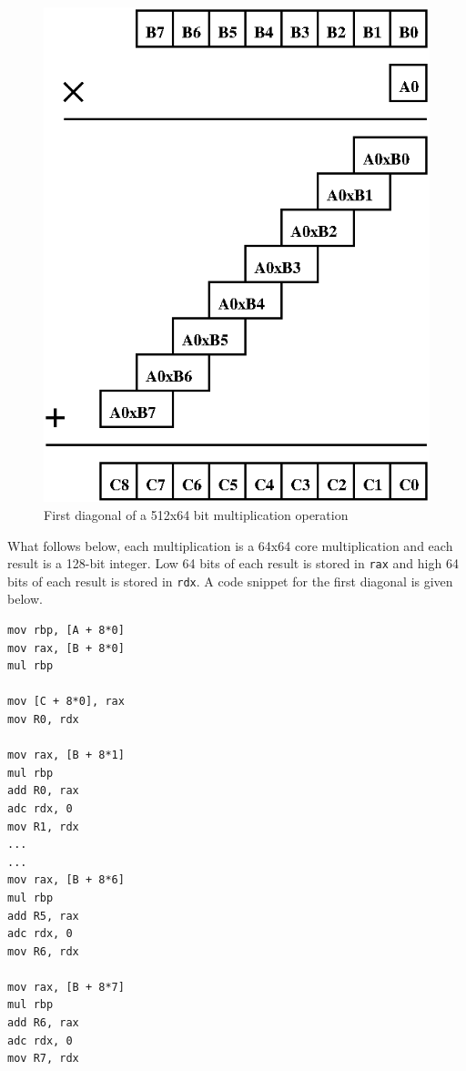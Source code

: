 \documentclass[twocolumn]{svjour3}          %
\begin{document}
\begin{figure}[ht]
\centering
  \includegraphics[scale=0.7]{multdiag0.eps}
\caption{First diagonal of a 512x64 bit multiplication operation}
\label{fig:diag0}
\end{figure}

What follows below, each multiplication is a 64x64 core multiplication and each result is a 128-bit integer.
%
Low 64 bits of each result is stored in \texttt{rax} and high 64 bits of each result is stored in \texttt{rdx}. A code snippet for the first diagonal is given below.


\begin{verbatim}
mov rbp, [A + 8*0]
mov rax, [B + 8*0]
mul rbp

mov [C + 8*0], rax
mov R0, rdx

mov rax, [B + 8*1]
mul rbp
add R0, rax
adc rdx, 0
mov R1, rdx
...
...
mov rax, [B + 8*6]
mul rbp
add R5, rax
adc rdx, 0
mov R6, rdx

mov rax, [B + 8*7]
mul rbp
add R6, rax
adc rdx, 0
mov R7, rdx
\end{verbatim}
\end{document}
